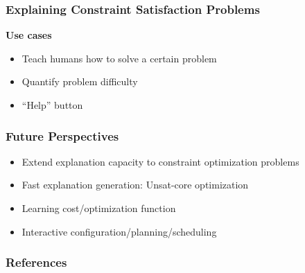 \documentclass{beamer}
\begin{document}

\begin{frame}
    \frametitle{\small{Explaining Constraint Satisfaction Problems}}
    \textbf{Use cases}
    \begin{itemize}
        \item Teach humans how to solve a certain problem
        \item Quantify problem difficulty
        \item “Help” button
    \end{itemize}

\end{frame}

\begin{frame}
    \frametitle{\small{Future Perspectives}}

    \begin{itemize}
        \item Extend explanation capacity to constraint optimization problems
        \item Fast explanation generation: Unsat-core optimization
        \item Learning cost/optimization function
        \item Interactive configuration/planning/scheduling
    \end{itemize}

\end{frame}




\begin{frame}
    \frametitle{References}
    \vspace{2em}
    
\end{frame}
\end{document}
